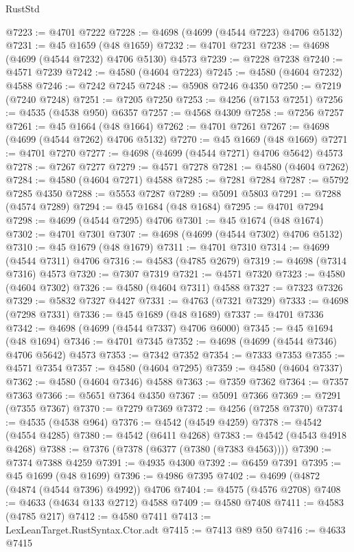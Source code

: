 \begin{lexlean}{RustStd}
\begin{coremodule}
@7223 := @4701 @7222
@7228 := @4698 (@4699 (@4544 @7223) @4706 @5132)
@7231 := @45 @1659 (@48 @1659)
@7232 := @4701 @7231
@7238 := @4698 (@4699 (@4544 @7232) @4706 @5130) @4573
@7239 := @7228 @7238
@7240 := @4571 @7239
@7242 := @4580 (@4604 @7223)
@7245 := @4580 (@4604 @7232) @4588
@7246 := @7242 @7245
@7248 := @5908 @7246 @4350
@7250 := @7219 (@7240 @7248)
@7251 := @7205 @7250
@7253 := @4256 (@7153 @7251)
@7256 := @4535 (@4538 @950) @6357
@7257 := @4568 @4309
@7258 := @7256 @7257
@7261 := @45 @1664 (@48 @1664)
@7262 := @4701 @7261
@7267 := @4698 (@4699 (@4544 @7262) @4706 @5132)
@7270 := @45 @1669 (@48 @1669)
@7271 := @4701 @7270
@7277 := @4698 (@4699 (@4544 @7271) @4706 @5642) @4573
@7278 := @7267 @7277
@7279 := @4571 @7278
@7281 := @4580 (@4604 @7262)
@7284 := @4580 (@4604 @7271) @4588
@7285 := @7281 @7284
@7287 := @5792 @7285 @4350
@7288 := @5553 @7287
@7289 := @5091 @5803
@7291 := @7288 (@4574 @7289)
@7294 := @45 @1684 (@48 @1684)
@7295 := @4701 @7294
@7298 := @4699 (@4544 @7295) @4706
@7301 := @45 @1674 (@48 @1674)
@7302 := @4701 @7301
@7307 := @4698 (@4699 (@4544 @7302) @4706 @5132)
@7310 := @45 @1679 (@48 @1679)
@7311 := @4701 @7310
@7314 := @4699 (@4544 @7311) @4706
@7316 := @4583 (@4785 @2679)
@7319 := @4698 (@7314 @7316) @4573
@7320 := @7307 @7319
@7321 := @4571 @7320
@7323 := @4580 (@4604 @7302)
@7326 := @4580 (@4604 @7311) @4588
@7327 := @7323 @7326
@7329 := @5832 @7327 @4427
@7331 := @4763 (@7321 @7329)
@7333 := @4698 (@7298 @7331)
@7336 := @45 @1689 (@48 @1689)
@7337 := @4701 @7336
@7342 := @4698 (@4699 (@4544 @7337) @4706 @6000)
@7345 := @45 @1694 (@48 @1694)
@7346 := @4701 @7345
@7352 := @4698 (@4699 (@4544 @7346) @4706 @5642) @4573
@7353 := @7342 @7352
@7354 := @7333 @7353
@7355 := @4571 @7354
@7357 := @4580 (@4604 @7295)
@7359 := @4580 (@4604 @7337)
@7362 := @4580 (@4604 @7346) @4588
@7363 := @7359 @7362
@7364 := @7357 @7363
@7366 := @5651 @7364 @4350
@7367 := @5091 @7366
@7369 := @7291 (@7355 @7367)
@7370 := @7279 @7369
@7372 := @4256 (@7258 @7370)
@7374 := @4535 (@4538 @964)
@7376 := @4542 (@4549 @4259)
@7378 := @4542 (@4554 @4285)
@7380 := @4542 (@6411 @4268)
@7383 := @4542 (@4543 @4918 @4268)
@7388 := @7376 (@7378 (@6377 (@7380 (@7383 @4563))))
@7390 := @7374 @7388 @4259
@7391 := @4935 @4300
@7392 := @6459 @7391
@7395 := @45 @1699 (@48 @1699)
@7396 := @4986 @7395
@7402 := @4699 (@4872 (@4874 (@4544 @7396) @4992)) @4706
@7404 := @4575 (@4576 @2708)
@7408 := @4633 (@4634 @133 @2712) @4588
@7409 := @4580 @7408
@7411 := @4583 (@4785 @217)
@7412 := @4580 @7411
@7413 := LexLeanTarget.RustSyntax.Ctor.adt
@7415 := @7413 @89 @50
@7416 := @4633 @7415

\end{coremodule}
\end{lexlean}
